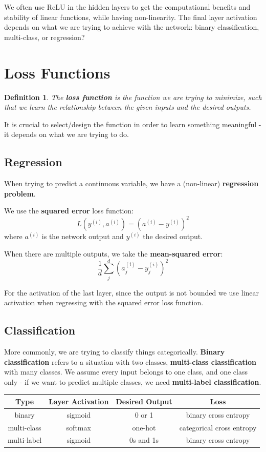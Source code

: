 \documentclass[11pt]{article}
\newtheorem{defn}{Definition}
\begin{document}
We often use ReLU in the hidden layers to get the computational benefits and stability of linear functions, while having non-linearity.
The final layer activation depends on what we are trying to achieve with the network: binary classification, multi-class, or regression? 

\section{Loss Functions}
\begin{defn}
  The \textbf{loss function} is the function we are trying to minimize, such that we learn the relationship between the given inputs and the desired outputs.
\end{defn}

It is crucial to select/design the function in order to learn something meaningful - it depends on what we are trying to do.

\subsection{Regression}
When trying to predict a continuous variable, we have a (non-linear) \textbf{regression problem}.

We use the \textbf{squared error} loss function:
\[
  L(y^{(i)}, a^{(i)})  = (a^{(i)} - y^{(i)})^2
\]
where $a^{(i)}$ is the network output and $y^{(i)}$ the desired output.

When there are multiple outputs, we take the \textbf{mean-squared error}:
\[
  \frac{1}{d} \sum_j^d (a_j^{(i)} - y_j^{(i)})^2 
\]

For the activation of the last layer, since the output is not bounded we use linear activation when regressing with the squared error loss function.

\subsection{Classification}
More commonly, we are trying to classify things categorically.
\textbf{Binary classification} refers to a situation with two classes, \textbf{multi-class classification} with many classes.
We assume every input belongs to one class, and one class only - if we want to predict multiple classes, we need \textbf{multi-label classification}.

\begin{center}
  \begin{tabular}{c | c | c | c}
    Type & Layer Activation & Desired Output & Loss \\
    \hline
    binary & sigmoid & 0 or 1 & binary cross entropy \\
    multi-class & softmax & one-hot & categorical cross entropy \\
    multi-label & sigmoid & 0s and 1s & binary cross entropy
  \end{tabular}
\end{center}
\end{document}
